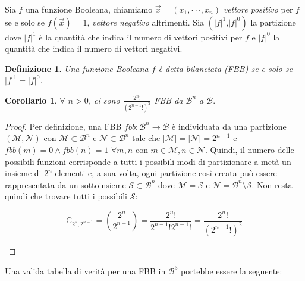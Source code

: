 \documentclass[12pt,a4paper,openright]{report}
\newtheorem{mydef}{Definizione}[chapter]
\newtheorem*{mycor}{Corollario}
\begin{document}
Sia $f$ una funzione Booleana, chiamiamo $\vec{x}=(x_1,\cdot\cdot\cdot,x_n)$ \textit{vettore positivo} per $f$ se e solo se
$f(\vec{x}) = 1$, \textit{vettore negativo} altrimenti. Sia $({\left\vert{f}\right\vert}^1 \text{,} {\left\vert{f}\right\vert}^0)$ la partizione dove ${\left\vert{f}\right\vert}^1$ è la quantità che indica il numero di vettori
positivi per $f$ e ${\left\vert{f}\right\vert}^0$ la quantità che indica il numero di vettori negativi.
\begin{mydef}
    Una funzione Booleana $f$ è detta bilanciata (FBB) se e solo se ${\left\vert{f}\right\vert}^1 = {\left\vert{f}\right\vert}^0$.
\end{mydef}
\begin{mycor}
    $\forall$ $n > 0$, ci sono $\frac{2^{n}!}{(2^{n-1}!)^2}$ FBB da $\mathcal{B}^n$ a $\mathcal{B}.$
\end{mycor}
\begin{proof}
    Per definizione, una FBB $fbb:\mathcal{B}^n\rightarrow\mathcal{B}$ è individuata da una partizione $(\mathcal{M},\mathcal{N})$ con $\mathcal{M}\subset\mathcal{B}^n$ e $\mathcal{N}\subset\mathcal{B}^n$ tale che
    $\left\vert{\mathcal{M}}\right\vert = \left\vert{\mathcal{N}}\right\vert = 2^{n-1}$ e $fbb(m)=0 \land fbb(n)=1$ $\forall{m,n}$ con $m\in\mathcal{M},n\in\mathcal{N}$.
    Quindi, il numero delle possibili funzioni corrisponde a tutti i possibili modi di partizionare a metà un insieme di $2^n$ elementi e, a sua volta, ogni partizione così creata può essere rappresentata 
    da un sottoinsieme $\mathcal{S}\subset\mathcal{B}^n$ dove $\mathcal{M}=\mathcal{S}$ e $\mathcal{N}=\mathcal{B}^n \setminus \mathcal{S}$.
    Non resta quindi che trovare tutti i possibili $\mathcal{S}$:  
    \begin{center}
    \[
        \mathbb{C}_{2^n,2^{n-1}}= \binom{2^n}{2^{n-1}} = \frac{2^n!}{2^{n-1}!2^{n-1}!} = \frac{2^n!}{(2^{n-1}!)^2}
    \]
    \end{center}
\end{proof}
Una valida tabella di verità per una FBB in $\mathcal{B}^3$ portebbe essere la seguente:
\end{document}
